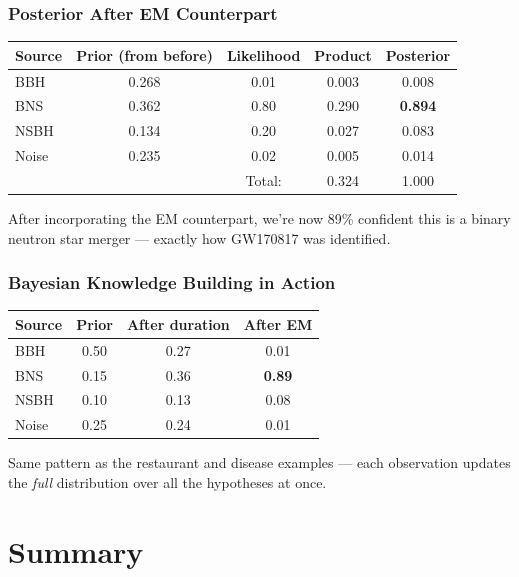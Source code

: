 \documentclass[slidestop,compress,mathserif]{beamer}
\begin{document}
\begin{frame}
    \frametitle{Posterior After EM Counterpart}
    \renewcommand{\arraystretch}{1.3}
    \begin{tabular}{l c c c c}
    \toprule
    Source & Prior (from before) & Likelihood & Product & Posterior \\
    \midrule
    BBH  & 0.268 & 0.01 & 0.003 & 0.008 \\
    BNS  & 0.362 & 0.80 & 0.290 & \textbf{0.894} \\
    NSBH & 0.134 & 0.20 & 0.027 & 0.083 \\
    Noise & 0.235 & 0.02 & 0.005 & 0.014 \\
    \midrule
    & & Total: & 0.324 & 1.000 \\
    \bottomrule
    \end{tabular}
    \pause

    \medskip
    After incorporating the EM counterpart, we're now 89\% confident this is a binary neutron star merger --- exactly how GW170817 was identified.
\end{frame}

\begin{frame}
    \frametitle{Bayesian Knowledge Building in Action}
    \begin{center}
    \begin{tabular}{l c c c}
    \toprule
    Source & Prior & After duration & After EM \\
    \midrule
    BBH  & 0.50 & 0.27 & 0.01 \\
    BNS  & 0.15 & 0.36 & \textbf{0.89} \\
    NSBH & 0.10 & 0.13 & 0.08 \\
    Noise & 0.25 & 0.24 & 0.01 \\
    \bottomrule
    \end{tabular}
    \end{center}
    \pause

    \medskip
    Same pattern as the restaurant and disease examples --- each observation updates the \emph{full} distribution over all the hypotheses at once.
\end{frame}


\section{Summary}
\end{document}
